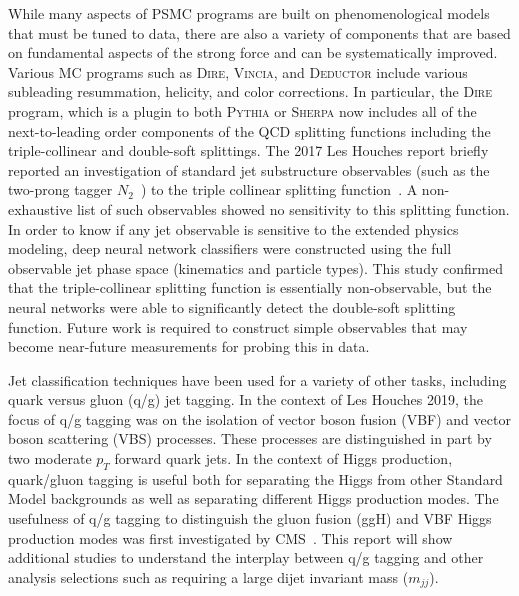 \documentclass[11pt]{cernrep}
\begin{document}
While many aspects of PSMC programs are built on phenomenological models that must be tuned to data, there are also a variety of components that are based on fundamental aspects of the strong force and can be systematically improved.  Various MC programs such as \textsc{Dire}, \textsc{Vincia}, and \textsc{Deductor} include various subleading resummation, helicity, and color corrections.  In particular, the \textsc{Dire} program, which is a plugin to both \textsc{Pythia} or \textsc{Sherpa} now includes all of the next-to-leading order components of the QCD splitting functions including the triple-collinear and double-soft splittings.   The 2017 Les Houches report briefly reported an investigation of standard jet substructure observables (such as the two-prong tagger $N_2$~\cite{Moult:2016cvt}) to the triple collinear splitting function~\cite{Bendavid:2018nar}.  A non-exhaustive list of such observables showed no sensitivity to this splitting function.  In order to know if any jet observable is sensitive to the extended physics modeling, deep neural network classifiers were constructed using the full observable jet phase space (kinematics and particle types).   This study confirmed that the triple-collinear splitting function is essentially non-observable, but the neural networks were able to significantly detect the double-soft splitting function.  Future work is required to construct simple observables that may become near-future measurements for probing this in data.

Jet classification techniques have been used for a variety of other tasks, including quark versus gluon (q/g) jet tagging.  In the context of Les Houches 2019, the focus of q/g tagging was on the isolation of vector boson fusion (VBF) and vector boson scattering (VBS) processes.  These processes are distinguished in part by two moderate $p_T$ forward quark jets.  In the context of Higgs production, quark/gluon tagging is useful both for separating the Higgs from other Standard Model backgrounds as well as separating different Higgs production modes.   The usefulness of q/g tagging to distinguish the gluon fusion (ggH) and VBF Higgs production modes was first investigated by CMS~\cite{Khachatryan:2015bnx}.  This report will show additional studies to understand the interplay between q/g tagging and other analysis selections such as requiring a large dijet invariant mass ($m_{jj}$).
\end{document}

